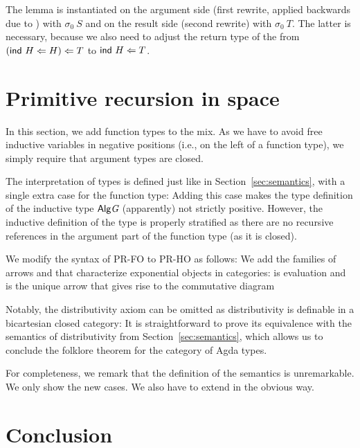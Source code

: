 \documentclass[a4paper,USenglish,cleveref, autoref, thm-restate]{lipics-v2021}
\begin{document}
The {\Aeq} lemma is instantiated on the argument side (first rewrite,
applied backwards due to \Asym) with $\sigma_0~S$ and on the result
side (second rewrite) with $\sigma_0~T$. The latter is necessary, because we also need
to adjust the return type of the {\Afmap} from $(\Aind~H \Leftarrow H)
\Leftarrow T$ to $\Aind~H \Leftarrow T$. 


\section{Primitive recursion in space}
\label{sec:prim-recurs-space}


In this section, we add function types to the mix. As we have to avoid
free inductive variables in negative positions (i.e., on the left of a
function type), we simply require that argument types are closed.
\cccDataTy

The interpretation of types is defined just like in
Section~\ref{sec:semantics}, with a single extra case for the function type:
\cccDataAlgArrow
Adding this case makes the type definition of the inductive type
${\AAlg{G}}$ (apparently) not strictly positive. However, the
inductive definition of the type is properly stratified as there are
no recursive references in the argument part of the function type (as
it is closed).

We modify the syntax of PR-FO to PR-HO as follows:
\cccPRIND
We add the families of arrows {\Alam} and {\Aapply} that characterize
exponential objects in categories: {\Aapply} is evaluation and {\Alam}
is the unique arrow that gives rise to the commutative diagram
\cccExpComm

Notably, the distributivity axiom can be omitted as distributivity is
definable in a bicartesian closed category:
\cccThetaDist
It is straightforward to prove its equivalence with the semantics of
distributivity from Section~\ref{sec:semantics}, which allows us to conclude
the folklore theorem \cite{https://doi.org/10.48550/arxiv.1406.0961}
for the category of Agda types. 
\cccEvalDistEqual

For completeness, we remark that the definition of the semantics is
unremarkable. We only show the new cases.
\cccEvalExponential
We also have to extend {\Afmap} in the obvious way.

\section{Conclusion}
\label{sec:conclusion}





\end{document}
